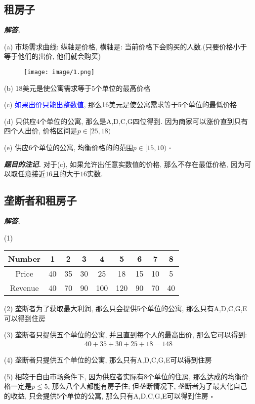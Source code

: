 \documentclass[10pt, a4paper, oneside]{ctexart}
\newenvironment{solution}{%
  \par\noindent\textbf{\textit{解答. }}\ignorespaces
}{%
  \hfill\ensuremath{\square}\par %
}
\newenvironment{note}{\par\noindent\textbf{\textit{题目的注记. }}\ignorespaces}{\par}
\begin{document}
\subsection{租房子}
\begin{solution}
(a) 市场需求曲线: 纵轴是价格, 横轴是: 当前价格下会购买的人数.(只要价格小于等于他们的出价, 他们就会购买)
\begin{figure}[h]
  \centering
  \texttt{[image: image/1.png]}
\end{figure}

(b) 18美元是使公寓需求等于5个单位的最高价格

(c) \textcolor{blue}{如果出价只能出整数值}, 那么16美元是使公寓需求等于5个单位的最低价格

(d) 只供应4个单位的公寓, 那么是A,D,C,G四位得到. 因为商家可以涨价直到只有四个人出价, 价格区间是$p\in [25, 18)$

(e) 供应6个单位的公寓, 均衡价格的的范围$p\in [15,10)$
\end{solution}
\begin{note}
对于(c), 如果允许出任意实数值的价格, 那么不存在最低价格, 因为可以取任意接近$16$且的大于$16$实数.
\end{note}

\subsection{垄断者和租房子}

\begin{solution}
(1)
\begin{center}
\begin{tabular}{ccccccccc}
\toprule
Number & 1 & 2 & 3 & 4 & 5 & 6 & 7 & 8 \\
\midrule
Price & 40 & 35 & 30 & 25 & 18 & 15 & 10 & 5 \\
Revenue & 40 & 70 & 90 & 100 & 120 & 90 & 70 & 40 \\
\bottomrule
\end{tabular}
\end{center}

(2) 垄断者为了获取最大利润, 那么只会提供5个单位的公寓, 那么只有A,D,C,G,E可以得到住房

(3) 垄断者只提供五个单位的公寓, 并且直到每个人的最高出价, 那么它可以得到:
\begin{align*}
  40+35+30+25+18=148
\end{align*}

(4) 垄断者只提供五个单位的公寓, 那么只有A,D,C,G,E可以得到住房

(5) 相较于自由市场条件下, 因为供应者实际有$8$个单位的住房, 那么达成的均衡价格一定是$p\leq 5$, 那么八个人都能有房子住; 但垄断情况下, 垄断者为了最大化自己的收益, 只会提供5个单位的公寓, 那么只有A,D,C,G,E可以得到住房
\end{solution}
\end{document}
